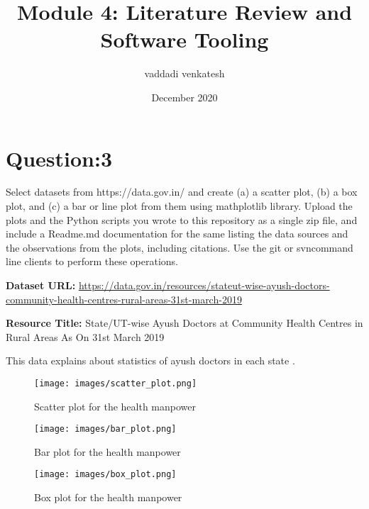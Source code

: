 \documentclass{article}
\title{Module 4: Literature Review and Software Tooling}
\author{vaddadi venkatesh }
\date{December 2020}
\begin{document}
\maketitle

\section{Question:3}
Select datasets from https://data.gov.in/ and create (a) a scatter plot, (b) a box plot, and (c) a bar or line plot from them using mathplotlib library. Upload the plots and the Python scripts you wrote to this repository as a single zip file, and include a Readme.md documentation for the same listing the data sources and the observations from the plots, including citations. Use the git or svncommand line clients to perform these operations.

\textbf{Dataset URL:} \href{https://data.gov.in/resources/stateut-wise-ayush-doctors-community-health-centres-rural-areas-31st-march-2019}{https://data.gov.in/resources/stateut-wise-ayush-doctors-community-health-centres-rural-areas-31st-march-2019}

\textbf{Resource Title:} State/UT-wise Ayush Doctors at Community Health Centres in Rural Areas As On 31st March 2019

This data explains about statistics of ayush doctors in each state\cite{ogdcommunity} .


\begin{figure}[h!]
\begin{center}
\advance\leftskip-2cm
\advance\rightskip-2cm
\texttt{[image: images/scatter\_plot.png]}
\caption{Scatter plot for the health manpower}
\label{visina8}
\end{center}
\end{figure}

\begin{figure}[h!]
\begin{center}
\advance\leftskip-2cm
\advance\rightskip-2cm
\texttt{[image: images/bar\_plot.png]}
\caption{Bar plot for the health manpower}
\label{visina8}
\end{center}
\end{figure}

\begin{figure}[h!]
\begin{center}
\advance\leftskip-2cm
\advance\rightskip-2cm
\texttt{[image: images/box\_plot.png]}
\caption{Box plot for the health manpower}
\label{visina8}
\end{center}
\end{figure}




\end{document}
